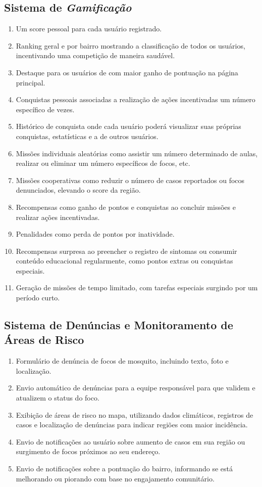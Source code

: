\documentclass[a5paper, 12pt]{article}
\begin{document}
\subsection{Sistema de \textit{Gamificação}}
\begin{enumerate}
    \item Um score pessoal para cada usuário registrado.
    \item Ranking geral e por bairro mostrando a classificação de todos os usuários, incentivando uma competição de maneira saudável.
    \item Destaque para os usuários de com maior ganho de pontuação na página principal.
    \item Conquistas pessoais associadas a realização de ações incentivadas um número específico de vezes.
    \item Histórico de conquista onde cada usuário poderá visualizar suas próprias conquistas, estatísticas e a de outros usuários.
    \item Missões individuais aleatórias como assistir um número determinado de aulas, realizar ou eliminar um número específicos de focos, etc.
    \item Missões cooperativas como reduzir o número de casos reportados ou focos denunciados, elevando o score da região.
    \item Recompensas como ganho de pontos e conquistas ao concluir missões e realizar ações incentivadas.
    \item Penalidades como perda de pontos por inatividade.
    \item Recompensas surpresa ao preencher o registro de sintomas ou consumir conteúdo educacional regularmente, como pontos extras ou conquistas especiais.
    \item Geração de missões de tempo limitado, com tarefas especiais surgindo por um período curto.
\end{enumerate}

\subsection{Sistema de Denúncias e Monitoramento de Áreas de Risco}
\begin{enumerate}
    \item Formulário de denúncia de focos de mosquito, incluindo texto, foto e localização.
    \item Envio automático de denúncias para a equipe responsável para que validem e atualizem o status do foco. 
    \item Exibição de áreas de risco no mapa, utilizando dados climáticos, registros de casos e localização de denúncias para indicar regiões com maior incidência.
    \item Envio de notificações ao usuário sobre aumento de casos em sua região ou surgimento de focos próximos ao seu endereço.
    \item Envio de notificações sobre a pontuação do bairro, informando se está melhorando ou piorando com base no engajamento comunitário.
\end{enumerate}
\end{document}
